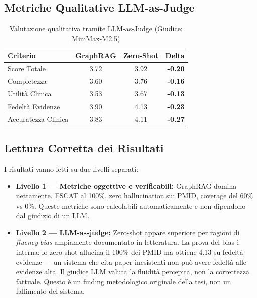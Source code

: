 \documentclass[12pt, a4paper]{article}
\newcommand{\fail}[1]{{\color{failred}\textbf{#1}}}
\begin{document}
\subsection{Metriche Qualitative LLM-as-Judge}

\begin{table}[htbp]
\centering
\small
\renewcommand{\arraystretch}{1.3}
\caption{Valutazione qualitativa tramite LLM-as-Judge (Giudice: MiniMax-M2.5)}
\begin{tabularx}{\textwidth}{l c c r}
\toprule
\rowcolor{primaryblue}
\color{white}\textbf{Criterio} & \color{white}\textbf{GraphRAG} & \color{white}\textbf{Zero-Shot} & \color{white}\textbf{Delta} \\
\midrule
Score Totale & 3.72 & 3.92 & \fail{-0.20} \\
\rowcolor{roweven}
Completezza & 3.60 & 3.76 & \fail{-0.16} \\
Utilità Clinica & 3.53 & 3.67 & \fail{-0.13} \\
\rowcolor{roweven}
Fedeltà Evidenze & 3.90 & 4.13 & \fail{-0.23} \\
Accuratezza Clinica & 3.83 & 4.11 & \fail{-0.27} \\
\bottomrule
\end{tabularx}
\end{table}

\subsection{Lettura Corretta dei Risultati}
I risultati vanno letti su due livelli separati:
\begin{itemize}[leftmargin=1.5em, itemsep=3pt]
  \item \textbf{Livello 1 --- Metriche oggettive e verificabili:} GraphRAG domina nettamente. ESCAT al 100\%, zero hallucination sui PMID, coverage del 60\% vs 0\%. Queste metriche sono calcolabili automaticamente e non dipendono dal giudizio di un LLM.
  \item \textbf{Livello 2 --- LLM-as-judge:} Zero-shot appare superiore per ragioni di \textit{fluency bias} ampiamente documentato in letteratura. La prova del bias è interna: lo zero-shot allucina il 100\% dei PMID ma ottiene 4.13 su fedeltà evidenze --- un sistema che cita paper inesistenti non può avere fedeltà alle evidenze alta. Il giudice LLM valuta la fluidità percepita, non la correttezza fattuale. Questo è un finding metodologico originale della tesi, non un fallimento del sistema.
\end{itemize}
\end{document}
